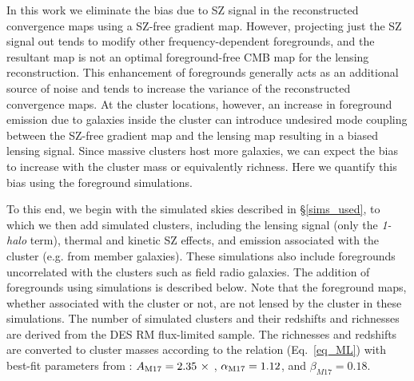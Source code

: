 In this work we eliminate the bias due to SZ signal in the reconstructed convergence maps using a SZ-free gradient map. 
However, projecting just the SZ signal out tends to modify other frequency-dependent foregrounds, and the resultant map is not an optimal foreground-free CMB map for the lensing reconstruction. 
This enhancement of foregrounds generally acts as an additional source of noise and tends to increase the variance of the reconstructed convergence maps. 
At the cluster locations, however, an increase in foreground emission due to galaxies inside the cluster can introduce undesired mode coupling between the SZ-free gradient map and the lensing map resulting in a biased lensing signal. 
Since massive clusters host more galaxies, we can expect the bias to increase with the cluster mass or equivalently richness. 
Here we quantify this bias using the \cite{sehgal10} foreground simulations.

To this end, we begin with the simulated skies described in \S\ref{sims_used}, to which we then add simulated clusters, including the lensing signal (only the {\it 1-halo} term), thermal and kinetic SZ effects, and emission associated with the cluster (e.g. from member galaxies). %
These simulations also include foregrounds uncorrelated with the clusters such as field radio galaxies.
The addition of foregrounds using \cite{sehgal10} simulations is described below. 
Note that the foreground maps, whether associated with the cluster or not, are not lensed by the cluster in these simulations. 
The number of simulated clusters and their redshifts and richnesses are derived from the  DES RM \whichyear{} flux-limited sample. %
The richnesses and redshifts are converted to cluster masses according to the \ML{} relation (Eq.~\ref{eq_ML}) with best-fit parameters from \citet{melchoir17}: $A_{\rm M17} = 2.35\ \times$ \munits, $\alpha_{\rm M17} = 1.12$, and $\beta_{M17} = 0.18$.  


